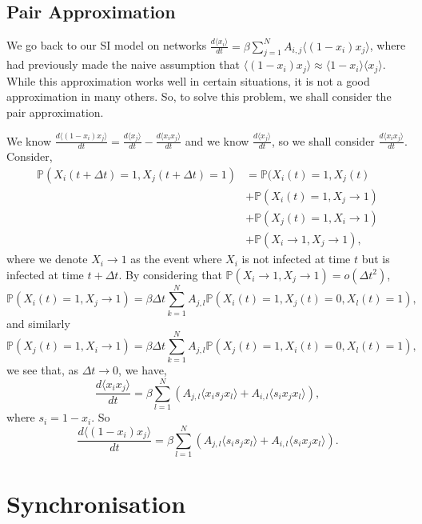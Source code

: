 \documentclass[
]{article}
\theoremstyle{definition}
\begin{document}
\hypertarget{pair-approximation}{%
\subsection{Pair Approximation}\label{pair-approximation}}

We go back to our SI model on networks
\(\frac{d\langle x_i \rangle}{dt} = \beta \sum_{j = 1}^N A_{i, j}\langle (1 - x_i)x_j \rangle\),
where had previously made the naive assumption that
\(\langle (1 - x_i)x_j \rangle \approx \langle 1 - x_i \rangle \langle x_j \rangle\).
While this approximation works well in certain situations, it is not a
good approximation in many others. So, to solve this problem, we shall
consider the pair approximation.

We know
\(\frac{d\langle (1 - x_i) x_j \rangle}{dt} = \frac{d\langle x_j \rangle}{dt} - \frac{d\langle x_i x_j \rangle}{dt}\)
and we know \(\frac{d\langle x_j \rangle}{dt}\), so we shall consider
\(\frac{d\langle x_i x_j \rangle}{dt}\). Consider, \begin{align*}
  \mathbb{P}(X_i (t + \Delta t) = 1, X_j (t + \Delta t) = 1) & = 
    \mathbb{P}(X_i (t) = 1, X_j (t) \\
  & + \mathbb{P}(X_i (t) = 1, X_j \to 1) \\
  & + \mathbb{P}(X_j (t) = 1, X_i \to 1) \\
  & + \mathbb{P}(X_i \to 1, X_j \to 1),
\end{align*} where we denote \(X_i \to 1\) as the event where \(X_i\) is
not infected at time \(t\) but is infected at time \(t + \Delta t\). By
considering that \(\mathbb{P}(X_i \to 1, X_j \to 1) = o(\Delta t^2)\),\\
\[\mathbb{P}(X_i (t) = 1, X_j \to 1) = \beta \Delta t 
  \sum_{k = 1}^N A_{j, l} \mathbb{P}(X_i(t) = 1, X_j(t) = 0, X_l(t) = 1),\]
and similarly \[\mathbb{P}(X_j (t) = 1, X_i \to 1) = \beta \Delta t 
  \sum_{k = 1}^N A_{j, l} \mathbb{P}(X_j(t) = 1, X_i(t) = 0, X_l(t) = 1),\]
we see that, as \(\Delta t \to 0\), we have,
\[\frac{d\langle x_i x_j \rangle}{dt} = \beta \sum_{l = 1}^N 
  \left(A_{j, l} \langle x_i s_j x_l \rangle + A_{i, l} \langle s_i x_j x_l \rangle \right),\]
where \(s_i = 1 - x_i\). So
\[\frac{d\langle (1 - x_i) x_j \rangle}{dt} = \beta \sum_{l = 1}^N 
  \left(A_{j, l} \langle s_i s_j x_l \rangle + A_{i, l} \langle s_i x_j x_l \rangle \right).\]

\hypertarget{synchronisation}{%
\section{Synchronisation}\label{synchronisation}}
\end{document}
